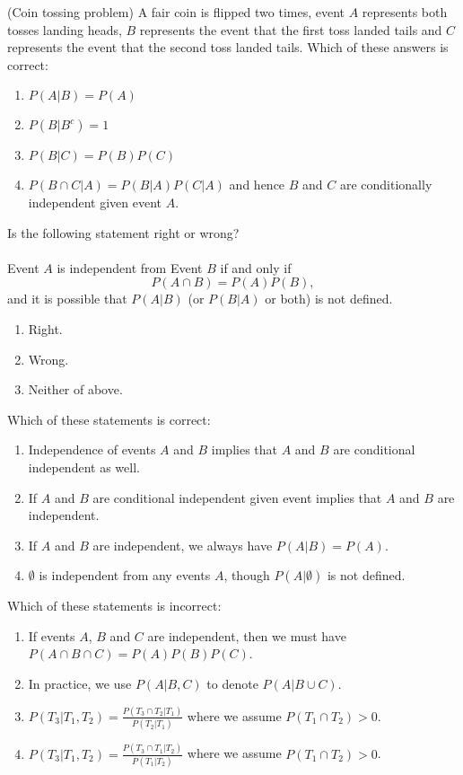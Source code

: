 \documentclass[poll_tutorial_format]{subfiles}
\begin{document}
\begin{exercise}
	(Coin tossing problem) A fair coin is flipped two times, event $A$ represents both tosses landing heads, $B$ represents the event that the first toss landed tails and $C$ represents the event that the second toss landed tails. 
	Which of these answers is correct: 
	\begin{enumerate}
		\item $P(A|B)=P(A)$  
		\item $P(B|B^c)=1$
		\item $P(B| C)=P(B)P(C)$  
		\item $P(B\cap C|A)=P(B|A)P(C|A)$ and hence $B$ and $C$ are conditionally independent given event $A$.  
	\end{enumerate}
\end{exercise}


\begin{exercise} 
Is the following statement right or wrong?\\~\\ Event $A$ is independent from Event $B$ if and only if $$P(A\cap B)=P(A)P(B),$$ and it is possible that $P(A|B)$ (or $P(B|A)$ or both) is not defined. 
	\begin{enumerate}
		\item Right.
		\item  Wrong.
		\item Neither of above.
	\end{enumerate}
\end{exercise}


\begin{exercise} 
	Which of these statements is correct: 
	\begin{enumerate}
		\item Independence of events $A$ and $B$ implies that $A$ and $B$ are conditional independent as well.
		\item If $A$ and $B$ are conditional independent given event implies that $A$ and $B$ are independent. 
		\item If $A$ and $B$ are independent, we always have $P(A|B)=P(A)$. 
		\item  $\emptyset$ is independent from any events $A$, though $P(A|\emptyset)$ is not defined.
	\end{enumerate}
\end{exercise}


\begin{exercise}
	Which of these statements is incorrect: 
	\begin{enumerate}
		\item If events $A$, $B$ and $C$ are independent, then we must have $P(A\cap B\cap C)=P(A)P(B)P(C)$.
		\item In practice, we use $P(A|B,C)$ to denote $P(A|B\cup C)$. 
		\item $P(T_3|T_1,T_2)=\frac{P(T_3\cap T_2|T_1)}{P(T_2|T_1)}$ where we assume $P(T_1\cap T_2)>0$. 
		\item $P(T_3|T_1,T_2)=\frac{P(T_3\cap T_1|T_2)}{P(T_1|T_2)}$ where we assume $P(T_1\cap T_2)>0$. 
	\end{enumerate}
\end{exercise}

	
 	
	
	
\end{document}
